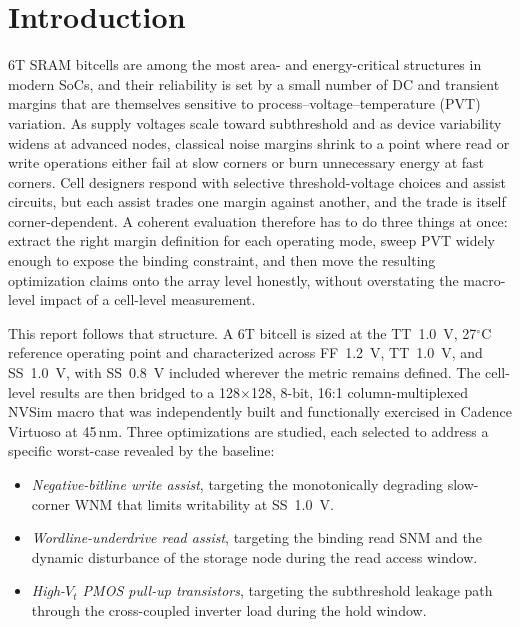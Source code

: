 \documentclass[pdflatex,sn-mathphys-num]{sn-jnl}%
\theoremstyle{thmstyleone}%
\theoremstyle{thmstyletwo}%
\theoremstyle{thmstylethree}%
\begin{document}
\section{Introduction}\label{sec:intro}

6T SRAM bitcells are among the most area- and energy-critical structures in modern SoCs, and their reliability is set by a small number of DC and transient margins that are themselves sensitive to process--voltage--temperature (PVT) variation. As supply voltages scale toward subthreshold and as device variability widens at advanced nodes, classical noise margins shrink to a point where read or write operations either fail at slow corners or burn unnecessary energy at fast corners. Cell designers respond with selective threshold-voltage choices and assist circuits, but each assist trades one margin against another, and the trade is itself corner-dependent. A coherent evaluation therefore has to do three things at once: extract the right margin definition for each operating mode, sweep PVT widely enough to expose the binding constraint, and then move the resulting optimization claims onto the array level honestly, without overstating the macro-level impact of a cell-level measurement.

This report follows that structure. A 6T bitcell is sized at the TT~1.0~V, 27$^\circ$C reference operating point and characterized across FF~1.2~V, TT~1.0~V, and SS~1.0~V, with SS~0.8~V included wherever the metric remains defined. The cell-level results are then bridged to a 128$\times$128, 8-bit, 16:1 column-multiplexed NVSim macro that was independently built and functionally exercised in Cadence Virtuoso at 45\,nm. Three optimizations are studied, each selected to address a specific worst-case revealed by the baseline:

\begin{itemize}
\item \emph{Negative-bitline write assist}, targeting the monotonically degrading slow-corner WNM that limits writability at SS~1.0~V.
\item \emph{Wordline-underdrive read assist}, targeting the binding read SNM and the dynamic disturbance of the storage node during the read access window.
\item \emph{High-$V_t$ PMOS pull-up transistors}, targeting the subthreshold leakage path through the cross-coupled inverter load during the hold window.
\end{itemize}
\end{document}
